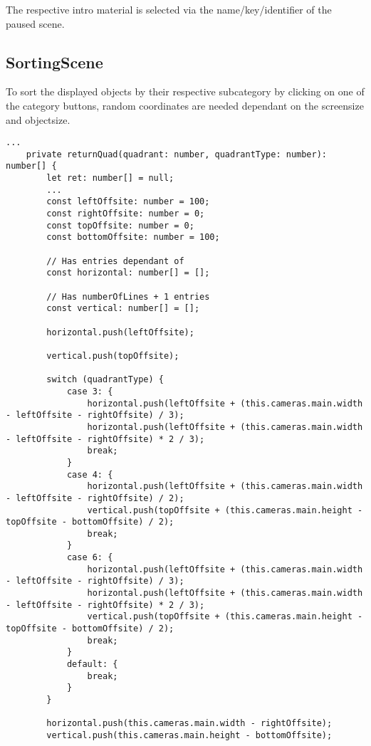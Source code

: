 The respective intro material is selected via the name/key/identifier of the paused scene.

\subsection{SortingScene}\label{subsec:sortingscene}
To sort the displayed objects by their respective subcategory by clicking on one of the category buttons,
random coordinates are needed dependant on the screensize and objectsize.
\begin{lstlisting}[style=TypeScript, caption={returnQuad() (sortingScene.ts)}]
    ...
    private returnQuad(quadrant: number, quadrantType: number): number[] {
        let ret: number[] = null;
        ...
        const leftOffsite: number = 100;
        const rightOffsite: number = 0;
        const topOffsite: number = 0;
        const bottomOffsite: number = 100;

        // Has entries dependant of
        const horizontal: number[] = [];

        // Has numberOfLines + 1 entries
        const vertical: number[] = [];

        horizontal.push(leftOffsite);

        vertical.push(topOffsite);

        switch (quadrantType) {
            case 3: {
                horizontal.push(leftOffsite + (this.cameras.main.width - leftOffsite - rightOffsite) / 3);
                horizontal.push(leftOffsite + (this.cameras.main.width - leftOffsite - rightOffsite) * 2 / 3);
                break;
            }
            case 4: {
                horizontal.push(leftOffsite + (this.cameras.main.width - leftOffsite - rightOffsite) / 2);
                vertical.push(topOffsite + (this.cameras.main.height - topOffsite - bottomOffsite) / 2);
                break;
            }
            case 6: {
                horizontal.push(leftOffsite + (this.cameras.main.width - leftOffsite - rightOffsite) / 3);
                horizontal.push(leftOffsite + (this.cameras.main.width - leftOffsite - rightOffsite) * 2 / 3);
                vertical.push(topOffsite + (this.cameras.main.height - topOffsite - bottomOffsite) / 2);
                break;
            }
            default: {
                break;
            }
        }

        horizontal.push(this.cameras.main.width - rightOffsite);
        vertical.push(this.cameras.main.height - bottomOffsite);


\end{lstlisting}

